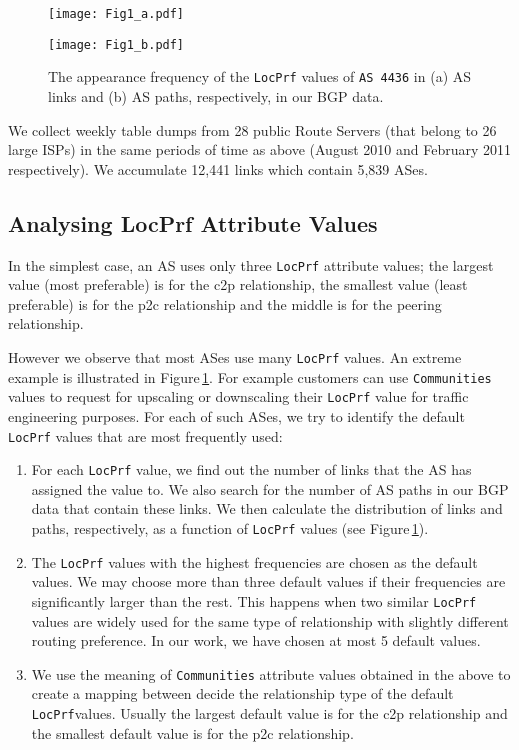 \documentclass[conference]{IEEEtran}
\begin{document}
\begin{figure}\centering
	\texttt{[image: Fig1\_a.pdf]}
	
	\texttt{[image: Fig1\_b.pdf]}
	\caption{The appearance frequency of the {\tt LocPrf} values of {\tt AS\,4436}  in (a) AS links and (b) AS paths, respectively, in our BGP data. }
	\label{fig:lp4436}
\end{figure}

We  collect weekly table dumps from 28 public Route Servers (that belong to 26 large ISPs) in the same periods of time as above (August 2010 and February 2011 respectively).  
We accumulate 12,441 links which contain 5,839 ASes.

\subsection{Analysing {LocPrf} Attribute Values}

In the simplest case, an AS uses only three {\tt LocPrf} attribute values; the largest value (most preferable) is for the c2p relationship, the smallest value (least preferable) is for the p2c relationship and the middle is for the peering relationship. 

However we observe that most ASes use many  {\tt LocPrf} values. An extreme example is illustrated in Figure\,\ref{fig:lp4436}. 
For example customers can use {\tt Communities}  values to request for upscaling or downscaling their {\tt LocPrf} value for traffic engineering purposes.
For each of such ASes, we try to identify the default {\tt LocPrf} values that are most frequently used:
\begin{enumerate}
	\item For each {\tt LocPrf}   value, we find out the number of links that the AS has assigned the value to. We also search for the number of AS paths in our BGP data that contain these links. We then calculate the distribution of links  and paths, respectively, as a function of  {\tt LocPrf}   values (see Figure\,\ref{fig:lp4436}). 
	\item The {\tt LocPrf} values with the highest frequencies  are chosen as the default values. We may choose more than three default values if their frequencies are significantly larger than  the rest. This happens when two similar {\tt LocPrf} values are  widely used for the same type of relationship with slightly different routing preference. In our work, we have chosen at most 5 default values.	
	\item We  use the meaning of {\tt Communities} attribute values obtained in the above to create a mapping between 
	decide the relationship type of the default  {\tt LocPrf}values. Usually the largest default  value  is for the c2p relationship and the smallest default value is for the p2c relationship. 
\end{enumerate}
\end{document}
